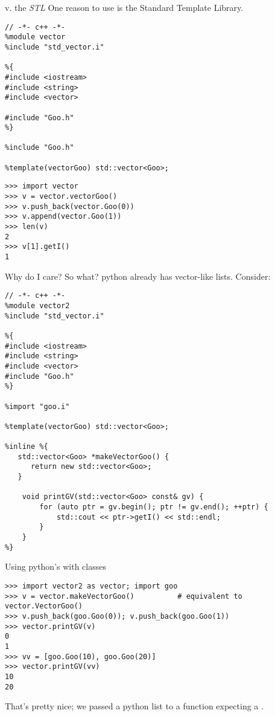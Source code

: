 \documentclass[10pt, t]{beamer}
\let\texttt=\graytt
\newcommand{\swig}{\texttt{swig}\xspace}  %
\begin{document}
\begin{frame}[fragile,label=sec-6-18]{\swig v. the \emph{STL}}
 One reason to use \CPP is the Standard Template Library.

\lstset{language=c++,label= ,caption= ,numbers=none}
\begin{lstlisting}
// -*- c++ -*-
%module vector
%include "std_vector.i"

%{
#include <iostream>
#include <string>
#include <vector>

#include "Goo.h"
%}

%include "Goo.h"

%template(vectorGoo) std::vector<Goo>;
\end{lstlisting}

\pause
\lstset{language=Python,label= ,caption= ,numbers=none}
\begin{lstlisting}
>>> import vector
>>> v = vector.vectorGoo()
>>> v.push_back(vector.Goo(0))
>>> v.append(vector.Goo(1))
>>> len(v)
2
>>> v[1].getI()
1
\end{lstlisting}
\end{frame}

\begin{frame}[fragile,label=sec-6-19]{Why do I care?}
 So what? python already has vector-like lists.
\pause
Consider:
\lstset{language=C,label= ,caption= ,numbers=none}
\begin{lstlisting}
// -*- c++ -*-
%module vector2
%include "std_vector.i"

%{
#include <iostream>
#include <string>
#include <vector>
#include "Goo.h"
%}

%import "goo.i"

%template(vectorGoo) std::vector<Goo>;

%inline %{
   std::vector<Goo> *makeVectorGoo() {
      return new std::vector<Goo>;
   }

    void printGV(std::vector<Goo> const& gv) {
        for (auto ptr = gv.begin(); ptr != gv.end(); ++ptr) {
            std::cout << ptr->getI() << std::endl;
        }
    }
%}
\end{lstlisting}
\end{frame}

\begin{frame}[fragile,label=sec-6-20]{Using python's \texttt{list} with \texttt{std::vector} classes}
 \lstset{language=Python,label= ,caption= ,numbers=none}
\begin{lstlisting}
>>> import vector2 as vector; import goo
>>> v = vector.makeVectorGoo()          # equivalent to vector.VectorGoo()
>>> v.push_back(goo.Goo(0)); v.push_back(goo.Goo(1))
>>> vector.printGV(v)
0
1
>>> vv = [goo.Goo(10), goo.Goo(20)]
>>> vector.printGV(vv)
10
20
\end{lstlisting}

\pause

That's pretty nice;  we passed a python list to a \CPP function expecting a \texttt{std::vector<>}.
\end{frame}
\end{document}

